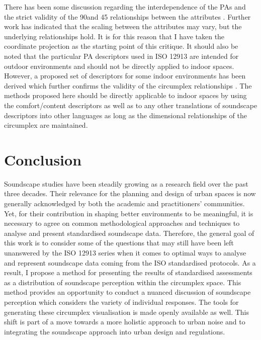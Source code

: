There has been some discussion regarding the interdependence of the PAs and the strict validity of the 90\textdegree and 45 \textdegree relationships between the attributes \citep{Lionello2021Introducing}. Further work has indicated that the scaling between the attributes may vary, but the underlying relationships hold. It is for this reason that I have taken the coordinate projection as the starting point of this critique. It should also be noted that the particular PA descriptors used in ISO 12913 are intended for outdoor environments and should not be directly applied to indoor spaces. However, a proposed set of descriptors for some indoor environments has been derived which further confirms the validity of the circumplex relationships \citep{Torresin2020Indoor}. The methods proposed here should be directly applicable to indoor spaces by using the comfort/content descriptors as well as to any other translations of soundscape descriptors into other languages \citep{Aletta2020Soundscape} as long as the dimensional relationships of the circumplex are maintained.

\section{Conclusion}
Soundscape studies have been steadily growing as a research field over the past three decades. Their relevance for the planning and design of urban spaces is now generally acknowledged by both the academic and practitioners' communities. Yet, for their contribution in shaping better environments to be meaningful, it is necessary to agree on common methodological approaches and techniques to analyse and present standardised soundscape data. Therefore, the general goal of this work is to consider some of the questions that may still have been left unanswered by the ISO 12913 series when it comes to optimal ways to analyse and represent soundscape data coming from the ISO standardised protocols. As a result, I propose a method for presenting the results of standardised assessments as a distribution of soundscape perception within the circumplex space. This method provides an opportunity to conduct a nuanced discussion of soundscape perception which considers the variety of individual responses. The tools for generating these circumplex visualisation is made openly available as well. This shift is part of a move towards a more holistic approach to urban noise and to integrating the soundscape approach into urban design and regulations.

